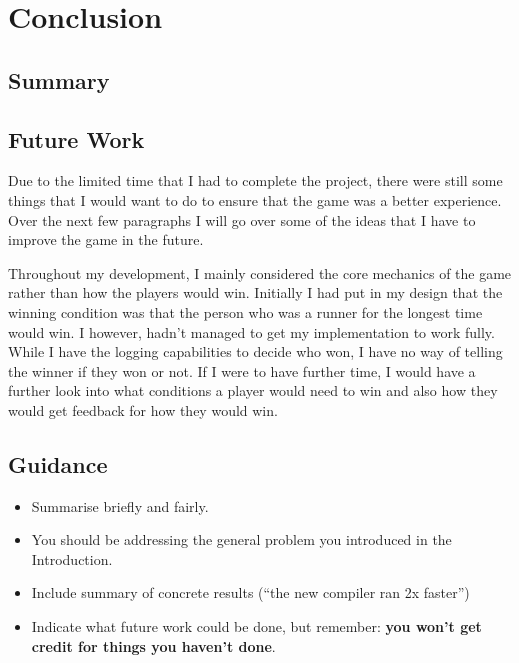 \documentclass{l4proj}
\begin{document}
\chapter{Conclusion}
\section{Summary}

\section{Future Work}
Due to the limited time that I had to complete the project, there were still some things that I would want to do
to ensure that the game was a better experience. Over the next few paragraphs I will go over some of the ideas
that I have to improve the game in the future.

Throughout my development, I mainly considered the core mechanics of the game rather than how the players would win.
Initially I had put in my design that the winning condition was that the person who was a runner for the longest time
would win. I however, hadn't managed to get my implementation to work fully. While I have the logging capabilities to
decide who won, I have no way of telling the winner if they won or not. If I were to have further time, I would have a
further look into what conditions a player would need to win and also how they would get feedback for how they would win.

\section{Guidance}
\begin{itemize}
    \item
        Summarise briefly and fairly.
    \item
        You should be addressing the general problem you introduced in the
        Introduction.        
    \item
        Include summary of concrete results (``the new compiler ran 2x
        faster'')
    \item
        Indicate what future work could be done, but remember: \textbf{you
        won't get credit for things you haven't done}.
\end{itemize}


%
% 
\end{document}
